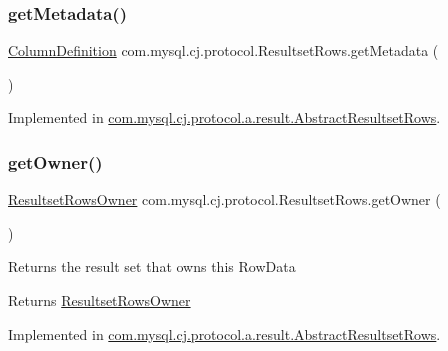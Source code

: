 \subsubsection{\texorpdfstring{get\+Metadata()}{getMetadata()}}
{\footnotesize\ttfamily \mbox{\hyperlink{interfacecom_1_1mysql_1_1cj_1_1protocol_1_1_column_definition}{Column\+Definition}} com.\+mysql.\+cj.\+protocol.\+Resultset\+Rows.\+get\+Metadata (\begin{DoxyParamCaption}{ }\end{DoxyParamCaption})}



Implemented in \mbox{\hyperlink{classcom_1_1mysql_1_1cj_1_1protocol_1_1a_1_1result_1_1_abstract_resultset_rows_af9d20b6a50813a1c1bf8695e68f46467}{com.\+mysql.\+cj.\+protocol.\+a.\+result.\+Abstract\+Resultset\+Rows}}.

\mbox{\label{interfacecom_1_1mysql_1_1cj_1_1protocol_1_1_resultset_rows_a495e468d6fb9aee61f47343ab45cdd52}} 
\subsubsection{\texorpdfstring{get\+Owner()}{getOwner()}}
{\footnotesize\ttfamily \mbox{\hyperlink{interfacecom_1_1mysql_1_1cj_1_1protocol_1_1_resultset_rows_owner}{Resultset\+Rows\+Owner}} com.\+mysql.\+cj.\+protocol.\+Resultset\+Rows.\+get\+Owner (\begin{DoxyParamCaption}{ }\end{DoxyParamCaption})}

Returns the result set that \textquotesingle{}owns\textquotesingle{} this Row\+Data

\begin{DoxyReturn}{Returns}
\mbox{\hyperlink{interfacecom_1_1mysql_1_1cj_1_1protocol_1_1_resultset_rows_owner}{Resultset\+Rows\+Owner}} 
\end{DoxyReturn}


Implemented in \mbox{\hyperlink{classcom_1_1mysql_1_1cj_1_1protocol_1_1a_1_1result_1_1_abstract_resultset_rows_ae7b769392c5668dabf45c80e36ec216e}{com.\+mysql.\+cj.\+protocol.\+a.\+result.\+Abstract\+Resultset\+Rows}}.

